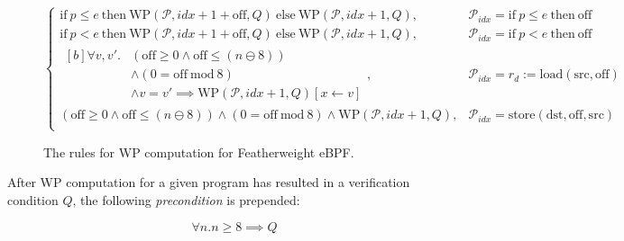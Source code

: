 \begin{figure}[H]
\[\begin{cases}
    \mathrm{if} ~ p \leq e ~ \mathrm{then} ~ \mathrm{WP}(\mathcal{P}, idx+1+\mathrm{off}, Q) ~ \mathrm{else} ~ \mathrm{WP}(\mathcal{P},idx+1, Q) , & \mathcal{P}_{idx} = \mathrm{if} ~ p \leq e ~ \mathrm{then} ~ \mathrm{\mathrm{off}} \\
    \mathrm{if} ~ p < e ~ \mathrm{then} ~ \mathrm{WP}(\mathcal{P}, idx+1+\mathrm{off}, Q) ~ \mathrm{else} ~ \mathrm{WP}(\mathcal{P},idx+1, Q) , & \mathcal{P}_{idx} = \mathrm{if} ~ p < e ~ \mathrm{then} ~ \mathrm{\mathrm{off}} \\
    \begin{aligned}[b] \forall v , v' . & (\mathrm{off} \geq 0 \land \mathrm{off} \leq (n \ominus 8) ) \\
                                        & \land (0 = \mathrm{off} ~ \mathrm{mod} ~ 8)
      \\ & \land v = v' \implies \mathrm{WP}(\mathcal{P}, idx+1, Q)[x \leftarrow v] \end{aligned}  , & \mathcal{P}_{idx} = r_d := \mathrm{load(src, off)} \\
(\mathrm{off} \geq 0 \land \mathrm{off} \leq (n \ominus 8) ) \land (0 = \mathrm{off} ~ \mathrm{mod} ~ 8)
\land \mathrm{WP}(\mathcal{P}, idx+1, Q)  , & \mathcal{P}_{idx} = \mathrm{store(dst, off, src)} \\
  \end{cases}
\]

  \caption{The rules for WP computation for Featherweight eBPF.}
  \label{fig:wp-rules}
\end{figure}



After WP computation for a given program has resulted in a verification condition $Q$, the following \textit{precondition} is prepended:

$$
\forall n . n \geq 8 \implies Q
$$
